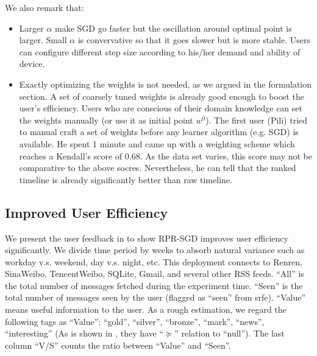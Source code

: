 \documentclass{sig-alternate}
\begin{document}
We also remark that:
\begin{itemize}
	\item Larger $\alpha$ make SGD go faster but the oscillation around 
		optimal point is larger. 
		Small $\alpha$ is convervative so that it goes slower but is more stable. 
		Users can configure different step size 
		according to his/her demand and ability of device. 
	\item Exactly optimizing the weights is not needed, 
		as we argued in the formulation section. 
		A set of coarsely tuned weights is already good enough
		to boost the user's efficiency. 
		Users who are conscious of their domain knowledge 
		can set the weights manually (or use it as initial point $w^0$). 
		The first user (Pili) tried to manual craft a set of weights
		before any learner algorithm (e.g. SGD) is available. 
		He spent 1 minute and came up with a weighting scheme 
		which reaches a Kendall's score of $0.68$. 
		As the data set varies, this score may not be comparative to the above socres. 
		Nevertheless, he can tell that the ranked timeline is 
		already significantly better than raw timeline. 
\end{itemize}



\subsection{Improved User Efficiency}
\label{sec:Improved User Efficiency}

We present the user feedback in \rtbl{\ref{tbl:user_eff}} to show RPR-SGD 
improves user efficiency significantly. 
We divide time period by weeks to absorb natural variance
such as workday v.s. weekend, day v.s. night, etc. 
This deployment connects to Renren, SinaWeibo, TencentWeibo, SQLite, Gmail, and several other RSS feeds. 
``All'' is the total number of messages fetched during the experiment time. 
``Seen'' is the total number of messages seen by the user
(flagged as ``seen'' from \gls{srfe}). 
``Value'' means useful information to the user. 
As a rough estimation, we regard the following tags as ``Value'':
``gold'', ``silver'', ``bronze'', ``mark'', ``news'', ``interesting''
(As is shown in \rfig{\ref{fig:graph_induction}}, they have ``$\succeq$'' relation to ``null''). 
The last column ``V/S'' counts the ratio between ``Value'' and ``Seen''. 
\end{document}
